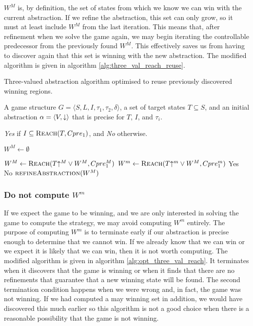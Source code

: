 $W^M$ is, by definition, the set of states from which we know we can win with the current abstraction. If we refine the abstraction, this set can only grow, so it must at least include $W^M$ from the last iteration. This means that, after refinement when we solve the game again, we may begin iterating the controllable predecessor from the previously found $W^M$. This effectively saves us from having to discover again that this set is winning with the new abstraction. The modified algorithm is given in algorithm \ref{alg:three_val_reach_reuse}.

\begin{algorithm}
\caption{Three-valued abstraction algorithm optimised to reuse previously discovered winning regions.}
\label{alg:three_val_reach_reuse}

\begin{algorithmic}[1]

     A game structure $G = \langle S, L, I, \tau_1, \tau_2, \delta \rangle$, a set 
    of target states $T\subseteq S$, and an initial abstraction $\alpha=\langle V, \mathord{\downarrow} \rangle$
    that is precise for $T$, $I$, and $\tau_i$.

     {\it Yes} if $I \subseteq \textsc{Reach}(T, Cpre_1)$, and {\it No} otherwise.

    \State $W^M \gets \emptyset$

    \Loop
        \State $W^M \gets \textsc{Reach}(T\mathord{\uparrow^M} \vee W^M, Cpre_1^M)$
        \State $W^m \gets \textsc{Reach}(T\mathord{\uparrow^m} \vee W^M, Cpre_1^m)$
            \State\Return Yes
            \State\Return No
        \Else       
            \State$\Call{refineAbstraction}{W^M}$
        \EndIf
    \EndLoop
\end{algorithmic}
\end{algorithm}

\subsubsection{Do not compute $W^m$}

If we expect the game to be winning, and we are only interested in solving the game to compute the strategy, we may avoid computing $W^m$ entirely. The purpose of computing $W^m$ is to terminate early if our abstraction is precise enough to determine that we cannot win. If we already know that we can win or we expect it is likely that we can win, then it is not worth computing. The modified algorithm is given in algorithm \ref{alg:opt_three_val_reach}. It terminates when it discovers that the game is winning or when it finds that there are no refinements that guarantee that a new winning state will be found. The second termination condition happens when we were wrong and, in fact, the game was not winning. If we had computed a may winning set in addition, we would have discovered this much earlier so this algorithm is not a good choice when there is a reasonable possibility that the game is not winning.

